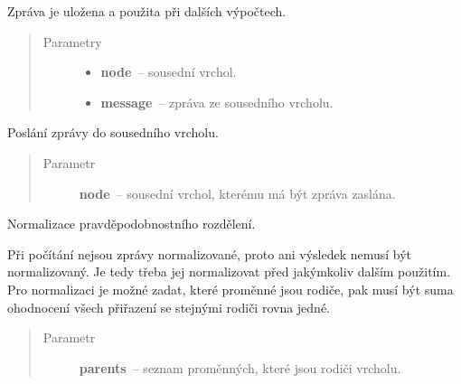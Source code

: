 \begin{fulllineitems}
\begin{fulllineitems}
Zpráva je uložena a použita při dalších výpočtech.
\begin{quote}\begin{description}
\item[{Parametry}] \leavevmode\begin{itemize}
\item {} 
\textbf{node}~-- sousední vrchol.

\item {} 
\textbf{message}~-- zpráva ze sousedního vrcholu.

\end{itemize}

\end{description}\end{quote}

\end{fulllineitems}


\begin{fulllineitems}
\label{alex.infer:alex.infer.factor.alex.infer.node.Node.message_to}
Poslání zprávy do sousedního vrcholu.
\begin{quote}\begin{description}
\item[{Parametr}] \leavevmode
\textbf{node}~-- sousední vrchol, kterému má být zpráva zaslána.

\end{description}\end{quote}

\end{fulllineitems}


\begin{fulllineitems}
\label{alex.infer:alex.infer.factor.alex.infer.node.Node.normalize}
Normalizace pravděpodobnostního rozdělení.

Při počítání nejsou zprávy normalizované, proto ani výsledek nemusí být
normalizovaný.
Je tedy třeba jej normalizovat před jakýmkoliv dalším
použitím. Pro normalizaci je možné zadat, které proměnné jsou rodiče,
pak musí být suma ohodnocení všech přiřazení se stejnými rodiči rovna
jedné.
\begin{quote}\begin{description}
\item[{Parametr}] \leavevmode
\textbf{parents}~-- seznam proměnných, které jsou rodiči vrcholu.


\end{description}
\end{quote}
\end{fulllineitems}
\end{fulllineitems}
